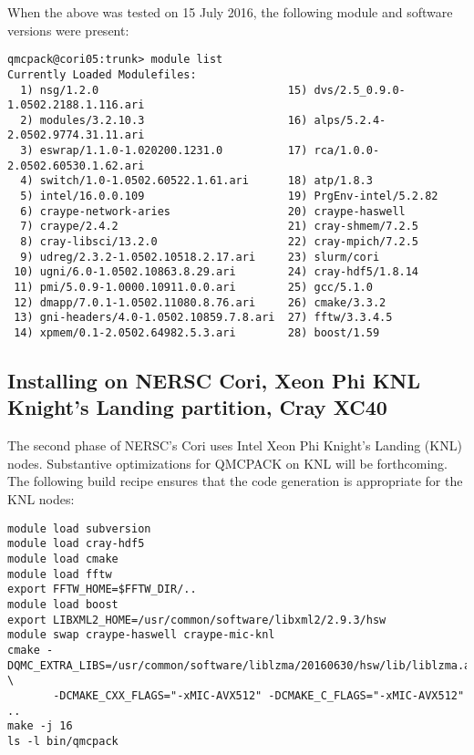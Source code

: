 When the above was tested on 15 July 2016, the following module and
software versions were present:

\begin{verbatim}
qmcpack@cori05:trunk> module list
Currently Loaded Modulefiles:
  1) nsg/1.2.0                             15) dvs/2.5_0.9.0-1.0502.2188.1.116.ari            
  2) modules/3.2.10.3                      16) alps/5.2.4-2.0502.9774.31.11.ari               
  3) eswrap/1.1.0-1.020200.1231.0          17) rca/1.0.0-2.0502.60530.1.62.ari                
  4) switch/1.0-1.0502.60522.1.61.ari      18) atp/1.8.3                                      
  5) intel/16.0.0.109                      19) PrgEnv-intel/5.2.82                            
  6) craype-network-aries                  20) craype-haswell                                 
  7) craype/2.4.2                          21) cray-shmem/7.2.5                               
  8) cray-libsci/13.2.0                    22) cray-mpich/7.2.5                               
  9) udreg/2.3.2-1.0502.10518.2.17.ari     23) slurm/cori                                     
 10) ugni/6.0-1.0502.10863.8.29.ari        24) cray-hdf5/1.8.14                               
 11) pmi/5.0.9-1.0000.10911.0.0.ari        25) gcc/5.1.0                                      
 12) dmapp/7.0.1-1.0502.11080.8.76.ari     26) cmake/3.3.2                                    
 13) gni-headers/4.0-1.0502.10859.7.8.ari  27) fftw/3.3.4.5                                   
 14) xpmem/0.1-2.0502.64982.5.3.ari        28) boost/1.59                                     
\end{verbatim}

\subsection{Installing on NERSC Cori, Xeon Phi KNL Knight's Landing partition, Cray XC40}
The second phase of NERSC's Cori uses Intel
Xeon Phi Knight's Landing (KNL) nodes. Substantive optimizations for QMCPACK on KNL will
be forthcoming. The following build recipe ensures that the code
generation is appropriate for the KNL nodes:

\begin{verbatim}
module load subversion
module load cray-hdf5
module load cmake
module load fftw
export FFTW_HOME=$FFTW_DIR/..
module load boost
export LIBXML2_HOME=/usr/common/software/libxml2/2.9.3/hsw
module swap craype-haswell craype-mic-knl
cmake -DQMC_EXTRA_LIBS=/usr/common/software/liblzma/20160630/hsw/lib/liblzma.a \
       -DCMAKE_CXX_FLAGS="-xMIC-AVX512" -DCMAKE_C_FLAGS="-xMIC-AVX512" ..
make -j 16
ls -l bin/qmcpack 
\end{verbatim}

